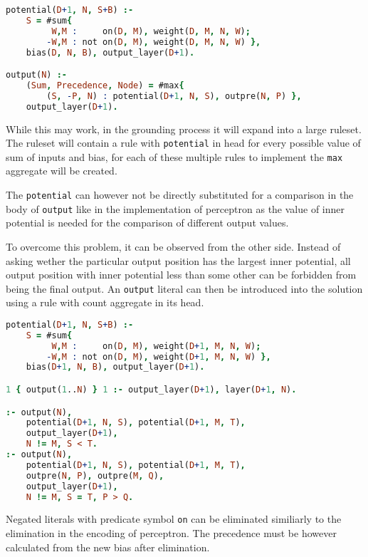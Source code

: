 \begin{lstlisting}[language=Prolog, numbers=none]
potential(D+1, N, S+B) :-
    S = #sum{
         W,M :     on(D, M), weight(D, M, N, W);
        -W,M : not on(D, M), weight(D, M, N, W) },
    bias(D, N, B), output_layer(D+1).

output(N) :-
    (Sum, Precedence, Node) = #max{
        (S, -P, N) : potential(D+1, N, S), outpre(N, P) },
    output_layer(D+1).
\end{lstlisting}

While this may work, in the grounding process it will expand into a large ruleset.
The ruleset will contain a rule with \texttt{potential} in head for every
possible value of sum of inputs and bias, for each of these multiple rules
to implement the \texttt{max} aggregate will be created.

The \texttt{potential} can however not be directly substituted for a comparison
in the body of \texttt{output} like in the implementation of perceptron
as the value of inner potential is needed for the comparison of different output values.

To overcome this problem, it can be observed from the other side.
Instead of asking wether the particular output position has the largest inner potential,
all output position with inner potential less than some other can be forbidden from being
the final output. An \texttt{output} literal can then be introduced into the solution
using a rule with count aggregate in its head.

\begin{lstlisting}[language=Prolog, numbers=none]
potential(D+1, N, S+B) :-
    S = #sum{
         W,M :     on(D, M), weight(D+1, M, N, W);
        -W,M : not on(D, M), weight(D+1, M, N, W) },
    bias(D+1, N, B), output_layer(D+1).

1 { output(1..N) } 1 :- output_layer(D+1), layer(D+1, N).

:- output(N),
    potential(D+1, N, S), potential(D+1, M, T),
    output_layer(D+1),
    N != M, S < T.
:- output(N),
    potential(D+1, N, S), potential(D+1, M, T),
    outpre(N, P), outpre(M, Q),
    output_layer(D+1),
    N != M, S = T, P > Q.
\end{lstlisting}

Negated literals with predicate symbol \texttt{on} can be eliminated similiarly
to the elimination in the encoding of perceptron. The precedence must be however
calculated from the new bias after elimination.%
\label{sec:01-argmax}

